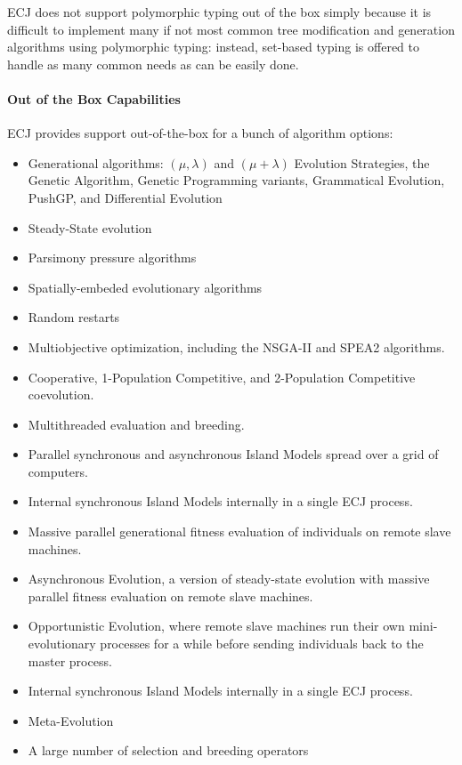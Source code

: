 \documentclass[twoside,10pt]{book}
\begin{document}
ECJ does not support polymorphic typing out of the box simply because it is difficult to implement many if not most common tree modification and generation algorithms using polymorphic typing: instead, set-based typing is offered to handle as many common needs as can be easily done. 

\paragraph{Out of the Box Capabilities}

ECJ provides support out-of-the-box for a bunch of algorithm options:

\begin{itemize}
\item Generational algorithms: \((\mu,\lambda)\) and \((\mu+\lambda)\) Evolution Strategies, the Genetic Algorithm, Genetic Programming variants, Grammatical Evolution, PushGP, and Differential Evolution
\item Steady-State evolution
\item Parsimony pressure algorithms
\item Spatially-embeded evolutionary algorithms
\item Random restarts
\item Multiobjective optimization, including the NSGA-II and SPEA2 algorithms.
\item Cooperative, 1-Population Competitive, and 2-Population Competitive coevolution.
\item Multithreaded evaluation and breeding.
\item Parallel synchronous and asynchronous Island Models spread over a grid of computers.
\item Internal synchronous Island Models internally in a single ECJ process.
\item Massive parallel generational fitness evaluation of individuals on remote slave machines.
\item Asynchronous Evolution, a version of steady-state evolution with massive parallel fitness evaluation on remote slave machines.
\item Opportunistic Evolution, where remote slave machines run their own mini-evolutionary processes for a while before sending individuals back to the master process.
\item Internal synchronous Island Models internally in a single ECJ process.
\item Meta-Evolution
\item A large number of selection and breeding operators
\end{itemize}
\end{document}
